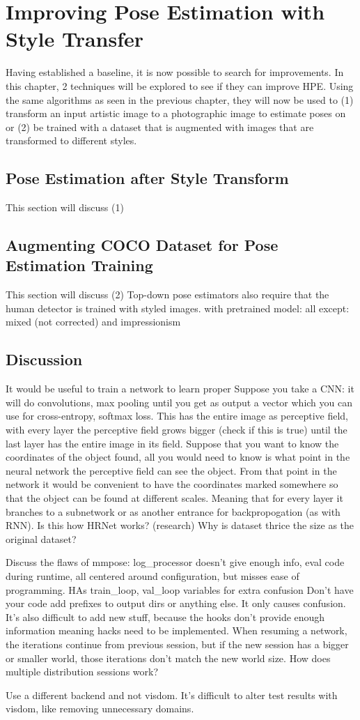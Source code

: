 \chapter{Improving Pose Estimation with Style Transfer}
\label{chap:improvements}
Having established a baseline, it is now possible to search for improvements.
In this chapter, 2 techniques will be explored to see if they can improve \gls{HPE}.
Using the same algorithms as seen in the previous chapter, they will now be used to
(1) transform an input artistic image to a photographic image to estimate poses on or
(2) be trained with a dataset that is augmented with images that are transformed to different styles.

\section{Pose Estimation after Style Transform}
This section will discuss (1)

\section{Augmenting COCO Dataset for Pose Estimation Training}
This section will discuss (2)
Top-down pose estimators also require that the human detector is trained with styled images.
with pretrained model: all except: mixed (not corrected) and impressionism

\section{Discussion}
It would be useful to train a network to learn proper 
Suppose you take a \gls{CNN}: it will do convolutions, max pooling until you get as output a vector which you can use for cross-entropy, softmax loss.
This has the entire image as perceptive field, with every layer the perceptive field grows bigger (check if this is true) until the last layer has the entire image in its field.
Suppose that you want to know the coordinates of the object found, all you would need to know is what point in the neural network the perceptive field can see the object.
From that point in the network it would be convenient to have the coordinates marked somewhere so that the object can be found at different scales.
Meaning that for every layer it branches to a subnetwork or as another entrance for backpropogation (as with RNN).
Is this how HRNet works? (research)
Why is dataset thrice the size as the original dataset?

Discuss the flaws of mmpose: log_processor doesn't give enough info, eval code during runtime, all centered around configuration, but misses ease of programming.
HAs train_loop, val_loop variables for extra confusion
Don't have your code add prefixes to output dirs or anything else. It only causes confusion.
It's also difficult to add new stuff, because the hooks don't provide enough information meaning hacks need to be implemented.
When resuming a network, the iterations continue from previous session, but if the new session has a bigger or smaller world, those iterations don't match the new world size.
How does multiple distribution sessions work?

Use a different backend and not visdom. It's difficult to alter test results with visdom, like removing unnecessary domains.

